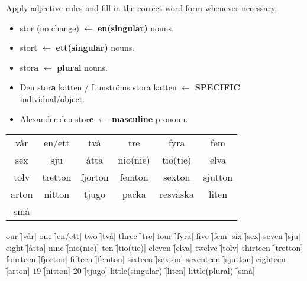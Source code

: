 \begin{flushleft}
    Apply adjective rules and fill in the correct word form whenever necessary, \\
    \begin{itemize}
        \item stor (no change) $\leftarrow$ \textbf{en(singular)} nouns.
        \item stor\textbf{t} $\leftarrow$ \textbf{ett(singular)} nouns.
        \item stor\textbf{a} $\leftarrow$ \textbf{plural} nouns.
        \item Den stor\textbf{a} katten / Lunströms stora katten $\leftarrow$ \textbf{SPECIFIC} individual/object.
        \item Alexander den stor\textbf{e} $\leftarrow$ \textbf{masculine} pronoun.
    \end{itemize}
\end{flushleft}
\begin{center}
    \begin{tabular}{|c c c c c c|}
        \hline
        vår & en/ett & två & tre & fyra & fem \\
        sex & sju & åtta & nio(nie) & tio(tie) & elva \\
        tolv & tretton & fjorton & femton & sexton & sjutton \\
        arton & nitton & tjugo & packa & resväska & liten \\
        små &&&&& \\
        \hline
    \end{tabular}
\end{center}

\begin{questions}
    \begin{multicols}{3}
        \raggedcolumns
        \question our \f[vår]
        \question one \f[en/ett]
        \question two \f[två]
        \question three \f[tre]
        \question four \f[fyra]
        \question five \f[fem]
        \question six \f[sex]
        \question seven \f[sju]
        \question eight \f[åtta]
        \question nine \f[nio(nie)]
        \question ten \f[tio(tie)]
        \question eleven \f[elva]
        \question twelve \f[tolv]
        \question thirteen \f[tretton]
        \question fourteen \f[fjorton]
        \question fifteen \f[femton]
        \question sixteen \f[sexton]
        \question seventeen \f[sjutton]
        \question eighteen \f[arton]
        \question $19$ \f[nitton]
        \question $20$ \f[tjugo]
        \question little(singular) \f[liten]
        \question little(plural) \f[små]
    \end{multicols}
\end{questions}